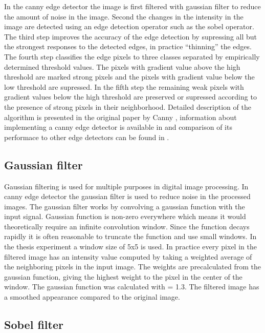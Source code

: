 In the canny edge detector the image is first filtered with gaussian filter to
reduce the amount of noise in the image. Second the changes in the intensity in
the image are detected using an edge detection operator such as the sobel
operator. The third step improves the accuracy of the edge detection by
supressing all but the strongest responses to the detected edges, in practice
``thinning'' the edges. The fourth step classifies the edge pixels to three
classes separated by empirically determined threshold values. The pixels with
gradient value above the high threshold are marked strong pixels and the pixels
with gradient value below the low threshold are supressed. In the fifth step the
remaining weak pixels with gradient values below the high threshold are
preserved or supressed according to the presence of strong pixels in their
neighborhood. Detailed description of the algorithm is presented in the original
paper by Canny \cite{canny1986computational}, information about implementing a
canny edge detector is available in \cite{gonzalez2008digital} and comparison of
its performace to other edge detectors can be found in \cite{maini2009study}.

\subsection{Gaussian filter}
\label{subsec:gauss}
Gaussian filtering is used for multiple purposes in digital image processing.
In canny edge detector the gaussian filter is used to reduce noise in the
processed images. The gaussian filter works by convolving a gaussian function
with the input signal. Gaussian function is non-zero everywhere which means it
would theoretically require an infinite convolution window. Since the function
decays rapidly it is often reasonable to truncate the function and use small
windows. \cite{gonzalez2008digital} In the thesis experiment a window size of
5x5 is used. In practice every pixel in the filtered image has an intensity
value computed by taking a weighted average of the neighboring pixels in the
input image. The weights are precalculated from the gaussian function, giving
the highest weight to the pixel in the center of the window. The gaussian
function was calculated with \sigma = 1.3. The filtered image has a smoothed
appearance compared to the original image.

\subsection{Sobel filter}
\label{subsec:sobel}

